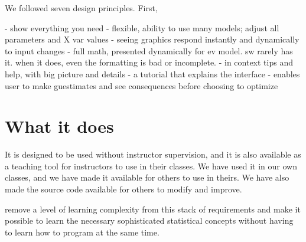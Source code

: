 \documentclass[12pt]{article}
\theoremstyle{definition}
\begin{document}
We followed seven design principles.  First, 

- show everything you need
- flexible, ability to use many models; adjust all parameters and X var values
- seeing graphics respond instantly and dynamically to input changes
- full math, presented dynamically for ev model.  sw rarely has it. when it does, even the formatting is bad or incomplete.
- in context tips and help, with big picture and details
- a tutorial that explains the interface
- enables user to make guestimates and see consequences before choosing to optimize

\section{What it does}

It is designed to be used without instructor supervision, and it is also available as a teaching tool for instructors to use in their classes.  We have used it in our own classes, and we have made it available for others to use in theirs.  We have also made the source code available for others to modify and improve.



remove a level of learning complexity from this stack of requirements and make it possible to learn the necessary sophisticated statistical concepts without having to learn how to program at the same time.  



\singlespace
\printbibliography
\end{document}

